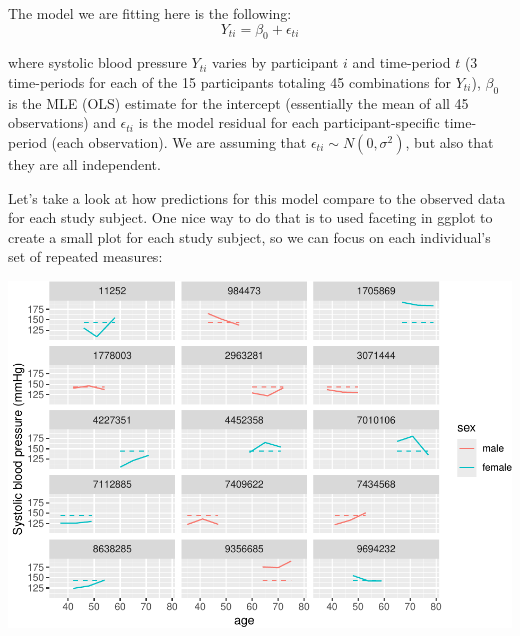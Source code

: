 \documentclass[
]{book}
\newenvironment{Shaded}{\begin{snugshade}}{\end{snugshade}}
\newcommand{\DataTypeTok}[1]{\textcolor[rgb]{0.13,0.29,0.53}{#1}}
\newcommand{\DecValTok}[1]{\textcolor[rgb]{0.00,0.00,0.81}{#1}}
\newcommand{\KeywordTok}[1]{\textcolor[rgb]{0.13,0.29,0.53}{\textbf{#1}}}
\newcommand{\NormalTok}[1]{#1}
\newcommand{\OperatorTok}[1]{\textcolor[rgb]{0.81,0.36,0.00}{\textbf{#1}}}
\newcommand{\StringTok}[1]{\textcolor[rgb]{0.31,0.60,0.02}{#1}}
\begin{document}
The model we are fitting here is the following:
\[
Y_{ti} = \beta_{0} + \epsilon_{ti}
\]

where systolic blood pressure \(Y_{ti}\) varies by participant \(i\) and time-period
\(t\) (3 time-periods for each of the 15 participants totaling 45 combinations
for \(Y_{ti}\)), \(\beta_{0}\) is the MLE (OLS) estimate for the intercept (essentially
the mean of all 45 observations) and \(\epsilon_{ti}\) is the model residual for each
participant-specific time-period (each observation). We are assuming that
\(\epsilon_{ti} \sim N(0,\sigma^2)\), but also that they are all independent.

Let's take a look at how predictions for this model compare to the observed data
for each study subject. One nice way to do that is to used faceting in ggplot to
create a small plot for each study subject, so we can focus on each individual's
set of repeated measures:

\begin{Shaded}
\end{Shaded}

\includegraphics{adv_epi_analysis_files/figure-latex/unnamed-chunk-289-1.pdf}
\end{document}
